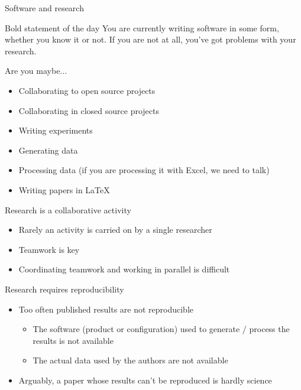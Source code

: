 \documentclass[presentation]{beamer}
\begin{document}
\begin{frame}{Software and research}
    \begin{block}{Bold statement of the day}
    You are currently writing software in some form, whether you know it or not. If you are not at all, you've got problems with your research.
    \end{block}
    \begin{block}{Are you maybe...}
        \begin{itemize}
            \item Collaborating to open source projects
            \item Collaborating in closed source projects
            \item Writing experiments
            \item Generating data
            \item Processing data (if you are processing it with Excel, we need to talk)
            \item Writing papers in LaTeX
        \end{itemize}
    \end{block}
    \begin{block}{Research is a collaborative activity}
        \begin{itemize}
            \item Rarely an activity is carried on by a single researcher
            \item Teamwork is key
            \item Coordinating teamwork and working in parallel is difficult
        \end{itemize}
    \end{block}
    \begin{block}{Research requires reproducibility}
        \begin{itemize}
            \item Too often published results are not reproducible
            \begin{itemize}
                \item The software (product or configuration) used to generate / process the results is not available
                \item The actual data used by the authors are not available
            \end{itemize}
            \item Arguably, a paper whose results can't be reproduced is hardly science
        \end{itemize}
    \end{block}
\end{frame}
\end{document}
